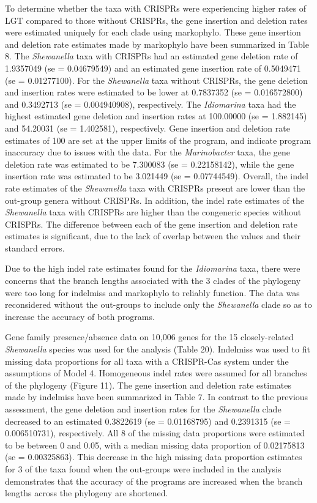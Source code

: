 \documentclass[english]{article}
\begin{document}
To determine  whether  the taxa  with CRISPRs  were experiencing
higher rates of LGT compared to those without CRISPRs,  the gene
insertion and deletion rates were estimated uniquely for each clade
using markophylo. These gene insertion and deletion rate estimates made
by markophylo have been summarized in Table 8.  The \textit{Shewanella} taxa with CRISPRs 
had an estimated
gene deletion rate of 1.9357049 (se = 0.04679549) and an estimated
gene insertion rate of 0.5049471 (se = 0.01277100). For the
\textit{Shewanella}
taxa without  CRISPRs,  the gene deletion and insertion rates were
estimated to be lower at 0.7837352 (se = 0.016572800) and 0.3492713
(se = 0.004940908), respectively. The \textit{Idiomarina} 
taxa had the highest
estimated gene deletion and insertion rates at 100.00000 (se =
1.882145) and 54.20031 (se = 1.402581), respectively. Gene insertion
and deletion rate estimates of 100 are set at the upper limits of the
program, and indicate program inaccuracy due to issues with the data.  For the
\textit{Marinobacter} taxa, the gene deletion rate was 
estimated to be 7.300083
(se = 0.22158142), while the gene  insertion rate was estimated to be
3.021449 (se = 0.07744549).  Overall, the indel rate estimates of the
\textit{Shewanella} taxa with CRISPRs present are lower than the out-group
genera without CRISPRs. In addition, the indel rate estimates of the
\textit{Shewanella} taxa with CRISPRs are higher than the congeneric species
without CRISPRs.  The difference between each of the gene
insertion and deletion rate  estimates  is significant,
due to the  lack of overlap between the  values and their standard
errors. 

Due to the high indel rate estimates found for the \textit{Idiomarina}
taxa, there were concerns that the  branch  lengths  associated  with  the
3 clades of the phylogeny were too long for indelmiss and markophylo
to reliably function.  The data was reconsidered without  the
out-groups  to include only the \textit{Shewanella}  clade 
so as to increase
the accuracy of both programs. 

Gene family presence/absence data on 10,006 genes for the 15
closely-related \textit{Shewanella} species was 
used for the  analysis  (Table
20).  Indelmiss was used to fit missing data proportions  for all taxa
with a CRISPR-Cas system under  the assumptions  of Model 4.
Homogeneous indel rates  were assumed for all branches  of the
phylogeny (Figure  11).  The gene insertion and deletion rate
estimates made by indelmiss have been summarized in Table 7. In contrast  to  the  previous  assessment,
the  gene deletion and insertion rates  for the \textit{Shewanella} clade
decreased to an estimated  0.3822619 (se = 0.01168795) and  0.2391315
(se = 0.006510731), respectively. All 8 of the missing data
proportions  were estimated to be between 0 and 0.05, with a median
missing data proportion of 0.02175813 (se = 0.00325863). This decrease
in the high missing data proportion estimates for 3 of the taxa found when
the out-groups were included in the analysis demonstrates that the
accuracy of the programs are increased when the branch lengths across
the phylogeny are shortened. 
\end{document}
